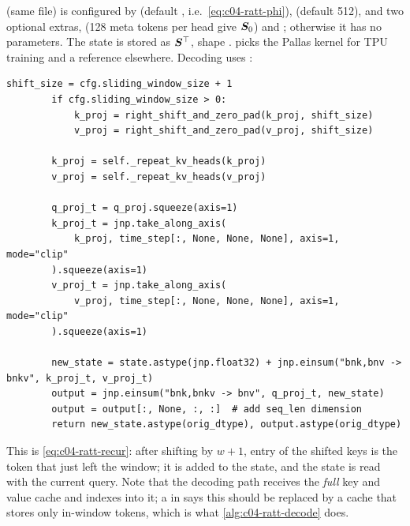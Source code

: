 \begin{implnote}[title={In the code: \texttt{ResidualLinearAttention} and decoding}]
 (same file) is configured by  (default
, i.e.\ \eqref{eq:c04-ratt-phi}),  (default 512),
and two optional extras,  (128 meta tokens per head give $\bm{S}_0$) and
; otherwise it has no parameters. The state is stored as $\bm{S}^{\top}$, shape
.  picks the Pallas
kernel for TPU training and a  reference elsewhere. Decoding uses
:
\begin{lstlisting}[caption={Excerpt from \texttt{repos/\allowbreak{}apple\_\_axlearn/\allowbreak{}axlearn/\allowbreak{}common/\allowbreak{}rattention/\allowbreak{}rattention.py}},label={lst:c04-ratt-step}]
        shift_size = cfg.sliding_window_size + 1
        if cfg.sliding_window_size > 0:
            k_proj = right_shift_and_zero_pad(k_proj, shift_size)
            v_proj = right_shift_and_zero_pad(v_proj, shift_size)

        k_proj = self._repeat_kv_heads(k_proj)
        v_proj = self._repeat_kv_heads(v_proj)

        q_proj_t = q_proj.squeeze(axis=1)
        k_proj_t = jnp.take_along_axis(
            k_proj, time_step[:, None, None, None], axis=1, mode="clip"
        ).squeeze(axis=1)
        v_proj_t = jnp.take_along_axis(
            v_proj, time_step[:, None, None, None], axis=1, mode="clip"
        ).squeeze(axis=1)

        new_state = state.astype(jnp.float32) + jnp.einsum("bnk,bnv -> bnkv", k_proj_t, v_proj_t)
        output = jnp.einsum("bnk,bnkv -> bnv", q_proj_t, new_state)
        output = output[:, None, :, :]  # add seq_len dimension
        return new_state.astype(orig_dtype), output.astype(orig_dtype)
\end{lstlisting}
This is \eqref{eq:c04-ratt-recur}: after shifting by $w+1$, entry  of the shifted
keys is the token that just left the window; it is added to the state, and the state is read with
the current query. Note that the decoding path receives the \emph{full} key and value cache and
indexes into it; a  in  says this should be replaced by a cache
that stores only in-window tokens, which is what \cref{alg:c04-ratt-decode} does.
\end{implnote}

